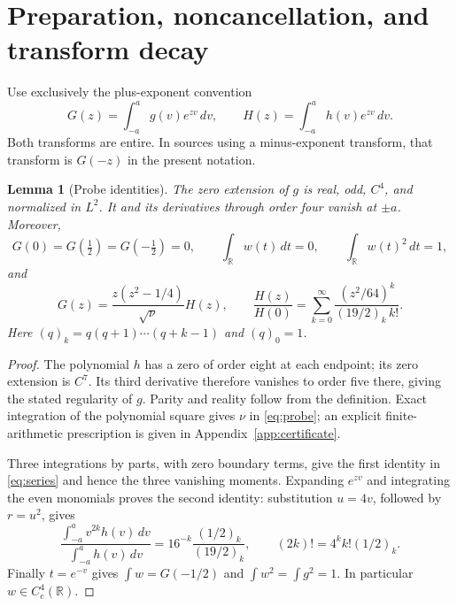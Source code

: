 \documentclass[11pt]{article}
\newtheorem{lemma}[theorem]{Lemma}
\theoremstyle{remark}
\newcommand{\dd}{\,d}
\newcommand{\R}{\mathbb R}
\numberwithin{equation}{section}
\begin{document}
\section{Preparation, noncancellation, and transform decay}\label{sec:probe}
Use exclusively the plus-exponent convention
\begin{equation}\label{eq:transforms}
G(z)=\int_{-a}^a g(v)e^{zv}\dd v,\qquad
H(z)=\int_{-a}^a h(v)e^{zv}\dd v.
\end{equation}
Both transforms are entire. In sources using a minus-exponent transform,
that transform is $G(-z)$ in the present notation.

\begin{lemma}[Probe identities]\label{lem:probe}
The zero extension of $g$ is real, odd, $C^4$, and normalized in $L^2$.
It and its derivatives through order four vanish at $\pm a$. Moreover,
\begin{equation}\label{eq:moments}
G(0)=G(\tfrac12)=G(-\tfrac12)=0,\qquad
\int_\R w(t)\dd t=0,\qquad \int_\R w(t)^2\dd t=1,
\end{equation}
and
\begin{equation}\label{eq:series}
G(z)=\frac{z(z^2-1/4)}{\sqrt\nu}H(z),\qquad
\frac{H(z)}{H(0)}=
\sum_{k=0}^\infty\frac{(z^2/64)^k}{(19/2)_k\,k!}.
\end{equation}
Here $(q)_k=q(q+1)\cdots(q+k-1)$ and $(q)_0=1$.
\end{lemma}
\begin{proof}
The polynomial $h$ has a zero of order eight at each endpoint; its zero
extension is $C^7$. Its third derivative therefore vanishes to order five
there, giving the stated regularity of $g$. Parity and reality follow
from the definition. Exact integration of the polynomial square gives
$\nu$ in \eqref{eq:probe}; an explicit finite-arithmetic prescription is
given in Appendix~\ref{app:certificate}.

Three integrations by parts, with zero boundary terms, give the first
identity in \eqref{eq:series} and hence the three vanishing moments.
Expanding $e^{zv}$ and integrating the even monomials proves the second
identity: substitution $u=4v$, followed by $r=u^2$, gives
\[
\frac{\int_{-a}^a v^{2k}h(v)\dd v}{\int_{-a}^a h(v)\dd v}
=16^{-k}\frac{(1/2)_k}{(19/2)_k},\qquad
(2k)!=4^k k!(1/2)_k.
\]
Finally $t=e^{-v}$ gives $\int w=G(-1/2)$ and
$\int w^2=\int g^2=1$. In particular $w\in C_c^4(\R)$.
\end{proof}
\end{document}
